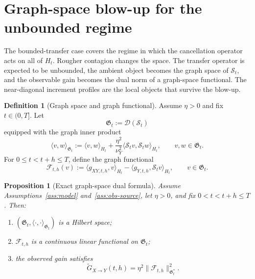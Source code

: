\documentclass[11pt,a4paper]{amsart}
\theoremstyle{plain}
\newtheorem{proposition}[theorem]{Proposition}
\theoremstyle{definition}
\newtheorem{definition}[theorem]{Definition}
\theoremstyle{remark}
\begin{document}
\section{Graph-space blow-up for the unbounded regime}\label{sec:unbounded}

The bounded-transfer case covers the regime in which the cancellation operator acts on all of
$H_t$.  Rougher contagion changes the space.  The transfer operator is expected to be unbounded,
the ambient object becomes the graph space of $\mathcal S_t$, and the observable gain becomes the
dual norm of a graph-space functional.  The near-diagonal increment profiles are the local objects
that survive the blow-up.

\begin{definition}[Graph space and graph functional]\label{def:graphspace}
Assume $\eta>0$ and fix $t\in(0,T]$. Let
\[
\mathfrak G_t:=\mathcal D(\mathcal S_t)
\]
equipped with the graph inner product
\begin{equation}\label{eq:graph-inner}
\langle v,w\rangle_{\mathfrak G_t}
:=
\langle v,w\rangle_{H_t}
+
\frac{\eta^2}{\nu_Y^2}\langle \mathcal S_t v,\mathcal S_t w\rangle_{H_t},
\qquad
v,w\in\mathfrak G_t.
\end{equation}
For $0\le t<t+h\le T$, define the graph functional
\begin{equation}\label{eq:graph-functional}
\mathcal F_{t,h}(v)
:=
\langle g_{XY,t,h},v\rangle_{H_t}
-\langle g_{Y,t,h},\mathcal S_t v\rangle_{H_t},
\qquad
v\in\mathfrak G_t.
\end{equation}
\end{definition}

\begin{proposition}[Exact graph-space dual formula]
\label{prop:graph-dual}
Assume Assumptions~\ref{ass:model} and~\ref{ass:obs-source}, let $\eta>0$, and fix
$0<t<t+h\le T$. Then:
\begin{enumerate}[label=(\roman*)]
\item $(\mathfrak G_t,\langle\cdot,\cdot\rangle_{\mathfrak G_t})$ is a Hilbert space;
\item $\mathcal F_{t,h}$ is a continuous linear functional on $\mathfrak G_t$;
\item the observed gain satisfies
\begin{equation}\label{eq:graph-dual}
\widetilde G_{X\to Y}(t,h)
=
\eta^2\|\mathcal F_{t,h}\|_{\mathfrak G_t^*}^2.
\end{equation}
\end{enumerate}
\end{proposition}
\end{document}
